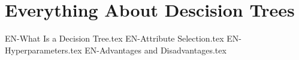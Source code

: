 \chapterspaceabove{6.75cm} %
\chapterspacebelow{7.25cm} %


\chapter{Everything About Descision Trees}

{EN-What Is a Decision Tree.tex}
{EN-Attribute Selection.tex}
{EN-Hyperparameters.tex}
{EN-Advantages and Disadvantages.tex}